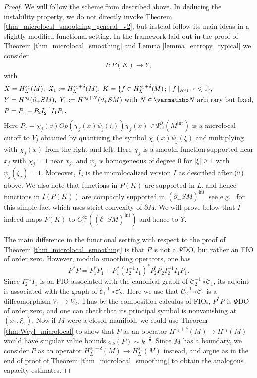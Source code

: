 \documentclass[12pt,twoside]{amsart}
\numberwithin{equation}{section}
\renewcommand{\leq}{\leqslant}
\renewcommand{\geq}{\geqslant}
\newcommand {\p} {\partial}
\newcommand{\abs}[1]{\lvert #1 \rvert}          %
\newcommand{\norm}[1]{\lVert #1 \rVert}         %
\begin{document}
\begin{proof}
We will follow the scheme from \cite{MSU15} described above. In deducing the instability property, we do not directly invoke Theorem \ref{thm_microlocal_smoothing_general_v2}, but instead follow its main ideas in a slightly modified functional setting. In the framework laid out in the proof of Theorem \ref{thm_microlocal_smoothing} and Lemma \ref{lemma_entropy_typical} we consider 
\begin{align*}
I: P(K) \rightarrow Y,
\end{align*}
with 
\begin{align}
\label{eq:func_set}
\begin{split}
&X = H^{s_1}_{L}(M),\ X_1:= H^{s_1 +  \delta}_{L}(M), \
 K = \{ f \in H^{s_1+ \delta}_{L}(M) \,;\, \norm{f}_{H^{s_1+\delta}} \leq 1 \},\\
&Y = H^{s_2}(\partial_+ SM),\ Y_1:= H^{s_2 + N}(\partial_+ SM) \mbox{ with } N \in \N \mbox{ arbitrary but fixed}, \\
 &P = P_1 - P_2 I_2^{-1} I_1 P_1.
\end{split}
\end{align}
Here $P_j = \chi_j(x)Op(\chi_j(x) \psi_j(\xi))\chi_j(x) \in \Psi^0_{\mathrm{cl}}(M^{\mathrm{int}})$ is a microlocal cutoff to $V_j$ obtained by quantizing the symbol $\chi_j(x) \psi_j(\xi)$ and multiplying with $\chi_j(x)$ from the right and left. Here $\chi_j$ is a smooth function supported near $x_j$ with $\chi_j = 1$ near $x_j$, and $\psi_j$ is homogeneous of degree $0$ for $\abs{\xi} \geq 1$ with $\psi_j(\xi_j) = 1$. Moreover, $I_j$ is the microlocalized version $I$ as described after (ii) above. We also note that functions in $P(K)$ are supported in $L$, and hence functions in $I(P(K))$ are compactly supported in $(\p_+ SM)^{\mathrm{int}}$, see e.g.\ \cite{PSU20+} for this simple fact which uses strict convexity of $\p M$. We will prove below that $I$ indeed maps $P(K)$ to $C^{\infty}_c((\p_+ SM)^{\mathrm{int}})$ and hence to $Y$.


The main difference in the functional setting with respect to the proof of Theorem \ref{thm_microlocal_smoothing} is that $P$ is not a $\Psi$DO, but rather an FIO of order zero. However, modulo smoothing operators, one has 
\[
P^* P = P_1^* P_1 + P_1^* (I_2^{-1} I_1)^* P_2^* P_2 I_2^{-1} I_1 P_1.
\]
Since $I_2^{-1} I_1$ is an FIO associated with the canonical graph of $\mathcal{C}_2^{-1} \circ \mathcal{C}_1$, its adjoint is associated with the graph of $\mathcal{C}_1^{-1} \circ \mathcal{C}_2$. Here we use that $\mathcal{C}_2^{-1} \circ \mathcal{C}_1$ is a diffeomorphism $V_1 \to V_2$. Thus by the composition calculus of FIOs, $P^* P$ is $\Psi$DO of order zero, and one can check that its principal symbol is nonvanishing at $(x_1, \xi_1)$. Now if $M$ were a closed manifold, we could use Theorem \ref{thm:Weyl_microlocal} to show that $P$ as an operator $H^{s_1+\delta}(M) \to H^{s_1}(M)$ would have singular value bounds $\sigma_k(P) \sim k^{-\frac{\delta}{2}}$. Since $M$ has a boundary, we consider $P$ as an operator $H^{s_1+\delta}_L(M) \to H^{s_1}_L(M)$ instead, and argue as in the end of proof of Theorem \ref{thm_microlocal_smoothing} to obtain the analogous capacity estimates.


\end{proof}
\end{document}

